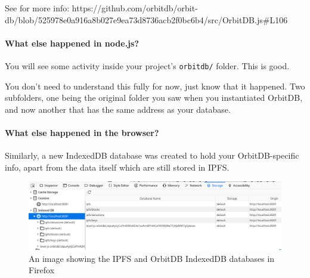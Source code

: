 See for more info:
https://github.com/orbitdb/orbit-db/blob/525978e0a916a8b027e9ea73d8736acb2f0bc6b4/src/OrbitDB.js\#L106

\paragraph{What else happened in
node.js?}\label{what-else-happened-in-node.js-3}

You will see some activity inside your project's \texttt{orbitdb/}
folder. This is good.

\begin{Shaded}
\begin{Highlighting}[]
\NormalTok{$ }

\NormalTok{$ }

\NormalTok{$ }
\end{Highlighting}
\end{Shaded}

You don't need to understand this fully for now, just know that it
happened. Two subfolders, one being the original folder you saw when you
instantiated OrbitDB, and now another that has the same address as your
database.

\paragraph{What else happened in the
browser?}\label{what-else-happened-in-the-browser-3}

Similarly, a new IndexedDB database was created to hold your
OrbitDB-specific info, apart from the data itself which are still stored
in IPFS.

\hypertarget{}{
\begin{figure}
\centering
\includegraphics{../images/ipfs_browser_2.png}
\caption{An image showing the IPFS and OrbitDB IndexedDB databases in
Firefox}
\end{figure}
}

